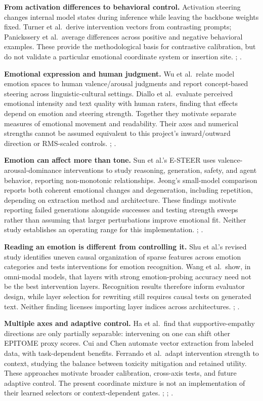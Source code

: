 \documentclass[manuscript,screen,nonacm]{acmart}
\begin{document}
\textbf{From activation differences to behavioral control.} Activation
steering changes internal model states during inference while leaving
the backbone weights fixed. Turner et al.~derive intervention vectors
from contrasting prompts; Panickssery et al.~average differences across
positive and negative behavioral examples. These provide the
methodological basis for contrastive calibration, but do not validate a
particular emotional coordinate system or insertion site.
\citep{turner2023actadd}; \citep{panickssery2024caa}.

\textbf{Emotional expression and human judgment.} Wu et al.~relate model
emotion spaces to human valence/arousal judgments and report
concept-based steering across linguistic-cultural settings. Diallo et
al.~evaluate perceived emotional intensity and text quality with human
raters, finding that effects depend on emotion and steering strength.
Together they motivate separate measures of emotional movement and
readability. Their axes and numerical strengths cannot be assumed
equivalent to this project's inward/outward direction or RMS-scaled
controls. \citep{wu2025emotion}; \citep{diallo2026style}.

\textbf{Emotion can affect more than tone.} Sun et al.'s E-STEER uses
valence-arousal-dominance interventions to study reasoning, generation,
safety, and agent behavior, reporting non-monotonic relationships.
Jeong's small-model comparison reports both coherent emotional changes
and degeneration, including repetition, depending on extraction method
and architecture. These findings motivate reporting failed generations
alongside successes and testing strength sweeps rather than assuming
that larger perturbations improve emotional fit. Neither study
establishes an operating range for this implementation.
\citep{sun2026emotion}; \citep{jeong2026emotion}.

\textbf{Reading an emotion is different from controlling it.} Shu et
al.'s revised study identifies uneven causal organization of sparse
features across emotion categories and tests interventions for emotion
recognition. Wang et al.~show, in omni-modal models, that layers with
strong emotion-probing accuracy need not be the best intervention
layers. Recognition results therefore inform evaluator design, while
layer selection for rewriting still requires causal tests on generated
text. Neither finding licenses importing layer indices across
architectures. \citep{shu2026emotion}; \citep{wang2026readbest}.

\textbf{Multiple axes and adaptive control.} Ha et al.~find that
supportive-empathy directions are only partially separable: intervening
on one can shift other EPITOME proxy scores. Cui and Chen automate
vector extraction from labeled data, with task-dependent benefits.
Ferrando et al.~adapt intervention strength to context, studying the
balance between toxicity mitigation and retained utility. These
approaches motivate broader calibration, cross-axis tests, and future
adaptive control. The present coordinate mixture is not an
implementation of their learned selectors or context-dependent gates.
\citep{ha2026empathy}; \citep{cui2025pas}; \citep{ferrando2025dsas}.
\end{document}
